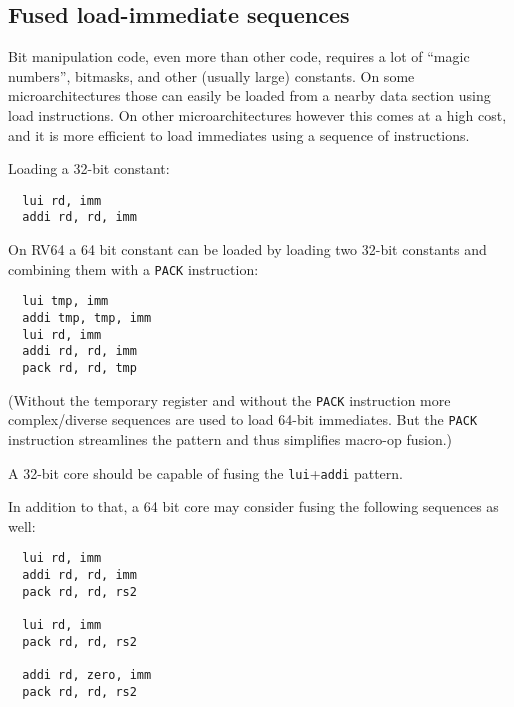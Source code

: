 
\subsection{Fused load-immediate sequences}

Bit manipulation code, even more than other code, requires a lot of ``magic numbers'',
bitmasks, and other (usually large) constants. On some microarchitectures those
can easily be loaded from a nearby data section using load instructions. On other
microarchitectures however this comes at a high cost, and it is more efficient
to load immediates using a sequence of instructions.

Loading a 32-bit constant:

\begin{minipage}{\linewidth}
\begin{verbatim}
  lui rd, imm
  addi rd, rd, imm
\end{verbatim}
\end{minipage}

On RV64 a 64 bit constant can be loaded by loading two 32-bit constants and combining them
with a {\tt PACK} instruction:

\begin{minipage}{\linewidth}
\begin{verbatim}
  lui tmp, imm
  addi tmp, tmp, imm
  lui rd, imm
  addi rd, rd, imm
  pack rd, rd, tmp
\end{verbatim}
\end{minipage}

(Without the temporary register and without the {\tt PACK} instruction more complex/diverse
sequences are used to load 64-bit immediates. But the {\tt PACK} instruction streamlines
the pattern and thus simplifies macro-op fusion.)

A 32-bit core should be capable of fusing the {\tt lui}+{\tt addi} pattern.

In addition to that, a 64 bit core may consider fusing the following sequences as well:

\begin{minipage}{\linewidth}
\begin{verbatim}
  lui rd, imm
  addi rd, rd, imm
  pack rd, rd, rs2

  lui rd, imm
  pack rd, rd, rs2

  addi rd, zero, imm
  pack rd, rd, rs2
\end{verbatim}
\end{minipage}

